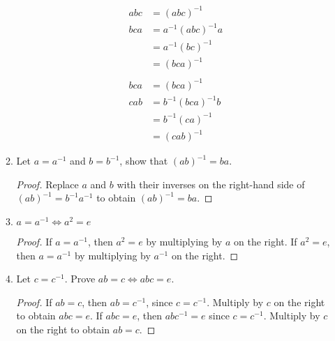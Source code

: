 \begin{enumerate}[label={\Alph*.},font={\bfseries}]
\begin{enumerate}[label={\arabic*},font={\bfseries}]
\begin{align*}
      abc &= (abc)^{-1} \\
      bca &= a^{-1}(abc)^{-1}a \\
      &= a^{-1}(bc)^{-1} \\
      &= (bca)^{-1} \\
      \\
      bca &= (bca)^{-1} \\
      cab &= b^{-1}(bca)^{-1}b \\
      &= b^{-1}(ca)^{-1} \\
      &= (cab)^{-1}
    \end{align*}
  \item Let $a = a^{-1}$ and $b = b^{-1}$, show that $(ab)^{-1} = ba$.
    \begin{proof}
      Replace $a$ and $b$ with their inverses on the right-hand side of
      $(ab)^{-1} = b^{-1}a^{-1}$ to obtain $(ab)^{-1} = ba$.
    \end{proof}
  \item $a = a^{-1} \iff a^2 = e$
    \begin{proof}
      If $a = a^{-1}$, then $a^2 = e$ by multiplying by $a$ on the right.
      If $a^2 = e$, then $a = a^{-1}$ by multiplying by $a^{-1}$ on the right.
    \end{proof}
  \item Let $c = c^{-1}$. Prove $ab = c \iff abc = e$.
    \begin{proof}
      If $ab = c$, then $ab = c^{-1}$, since $c = c^{-1}$.
      Multiply by $c$ on the right to obtain $abc = e$.
      If $abc = e$, then $abc^{-1} = e$ since $c = c^{-1}$.
      Multiply by $c$ on the right to obtain $ab = c$.
    \end{proof}
  \end{enumerate}
\end{enumerate}
